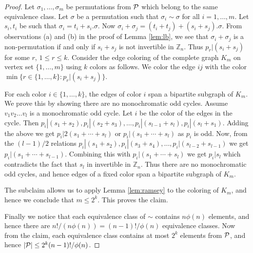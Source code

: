 \documentclass[12pt]{article}
\newcommand{\mb}{\mathbb}
\begin{document}
\begin{proof}
Let $\sigma_1,\ldots,\sigma_m$ be permutations from ${\cal P}$ which belong
to the same equivalence class. Let $\sigma$ be a permutation such that
$\sigma_i\sim \sigma$ for all $i=1,\ldots,m$. Let $s_i,t_i$ be such that
$\sigma_i=t_i+s_i.\sigma$. Now
$\sigma_i+\sigma_j=(t_i+t_j)+(s_i+s_j).\sigma$. From observations (a) and
(b) in the proof of Lemma \ref{lem:lb}, we see that $\sigma_i+\sigma_j$ is
a non-permutation if and only if $s_i+s_j$ is not invertible in $\mb{Z}_n$.
Thus $p_r | (s_i+s_j)$ for some $r$, $1\leq r\leq k$. Consider the edge coloring
of the complete graph $K_m$ on vertex set $\{1,\ldots,m\}$ using $k$ colors
as follows. We color the edge $ij$ with the color $\min\{r\in
\{1,\ldots,k\}: p_r | (s_i+s_j)\}$. \smallskip

 For each color $i\in \{1,\ldots,k\}$, the edges of
color $i$ span a bipartite subgraph of $K_m$. We prove this by showing
there are no monochromatic odd cycles. Assume $v_1v_2\ldots v_l$ is a
monochromatic odd cycle. Let $i$ be the color of the edges in the cycle.
Then $p_i | (s_1+s_2), p_i | (s_2+s_3), \ldots, p_i | (s_{l-1}+s_l), p_i |
(s_l+s_1)$. Adding the above we get $p_i | 2(s_1+\cdots+s_l)$ or $p_i |
(s_1+\cdots+s_l)$ as $p_i$ is odd. Now, from the $(l-1)/2$ relations $p_i |
(s_1+s_2), p_i | (s_3+s_4), \ldots, p_i | (s_{l-2} + s_{l-1})$ we get $p_i
| (s_1+\cdots + s_{l-1})$. Combining this with $p_i | (s_1+\cdots+s_l)$ we
get $p_i | s_l$ which contradicts the fact that $s_l$ in invertible in
$\mb{Z}_n$. Thus there are no monochromatic odd cycles, and hence edges of
a fixed color span a bipartite subgraph of $K_m$.\smallskip

The subclaim allows us to apply Lemma \ref{lem:ramsey} to the coloring of
$K_m$, and hence we conclude that $m\leq 2^k$. This proves the
claim.\medskip

Finally we notice that each equivalence class of $\sim$ contains $n\phi(n)$
elements, and hence there are $n!/(n\phi(n))=(n-1)!/\phi(n)$ equivalence
classes. Now from the claim, each equivalence class contains at most $2^k$
elements from ${\cal P}$, and hence $|{\cal P}|\leq
2^k(n-1)!/\phi(n)$. 
\end{proof}
\end{document}
